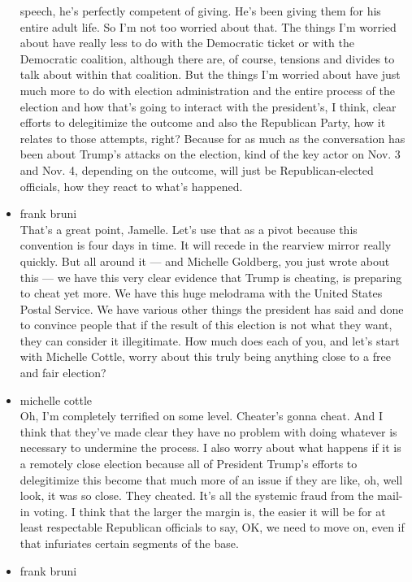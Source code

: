 \begin{itemize}
  speech, he's perfectly competent of giving. He's been giving them for
  his entire adult life. So I'm not too worried about that. The things
  I'm worried about have really less to do with the Democratic ticket or
  with the Democratic coalition, although there are, of course, tensions
  and divides to talk about within that coalition. But the things I'm
  worried about have just much more to do with election administration
  and the entire process of the election and how that's going to
  interact with the president's, I think, clear efforts to delegitimize
  the outcome and also the Republican Party, how it relates to those
  attempts, right? Because for as much as the conversation has been
  about Trump's attacks on the election, kind of the key actor on Nov. 3
  and Nov. 4, depending on the outcome, will just be Republican-elected
  officials, how they react to what's happened.
\item
  frank bruni\\
  That's a great point, Jamelle. Let's use that as a pivot because this
  convention is four days in time. It will recede in the rearview mirror
  really quickly. But all around it --- and Michelle Goldberg, you just
  wrote about this --- we have this very clear evidence that Trump is
  cheating, is preparing to cheat yet more. We have this huge melodrama
  with the United States Postal Service. We have various other things
  the president has said and done to convince people that if the result
  of this election is not what they want, they can consider it
  illegitimate. How much does each of you, and let's start with Michelle
  Cottle, worry about this truly being anything close to a free and fair
  election?
\item
  michelle cottle\\
  Oh, I'm completely terrified on some level. Cheater's gonna cheat. And
  I think that they've made clear they have no problem with doing
  whatever is necessary to undermine the process. I also worry about
  what happens if it is a remotely close election because all of
  President Trump's efforts to delegitimize this become that much more
  of an issue if they are like, oh, well look, it was so close. They
  cheated. It's all the systemic fraud from the mail-in voting. I think
  that the larger the margin is, the easier it will be for at least
  respectable Republican officials to say, OK, we need to move on, even
  if that infuriates certain segments of the base.
\item
  frank bruni\\

\end{itemize}
